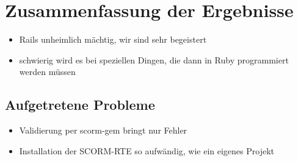 \chapter{Zusammenfassung der Ergebnisse}\label{ref:chaptConclusion}
\begin{k}
\begin{itemize}
  \item Rails unheimlich mächtig, wir sind sehr begeistert
  \item schwierig wird es bei speziellen Dingen, die dann in Ruby programmiert
  werden müssen
\end{itemize}
\end{k}
\section{Aufgetretene Probleme}\label{ref:problems}
\begin{k}
\begin{itemize}
  \item Validierung per scorm-gem bringt nur Fehler
  \item Installation der SCORM-RTE so aufwändig, wie ein eigenes Projekt
\end{itemize}
\end{k}